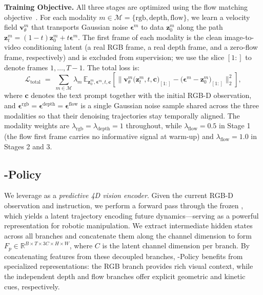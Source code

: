 \noindent
\textbf{Training Objective.}
All three stages are optimized using the flow matching objective~\citep{lipman2022flow}. For each modality $m \in \mathcal{M} = \{\text{rgb}, \text{depth}, \text{flow}\}$, we learn a velocity field $\bm{v}_\theta^m$ that transports Gaussian noise $\bm{\epsilon}^m$ to data $\bm{z}_0^m$ along the path $\bm{z}_t^m = (1-t)\bm{z}_0^m + t\bm{\epsilon}^m$. The first frame of each modality is the clean image-to-video conditioning latent (a real RGB frame, a real depth frame, and a zero-flow frame, respectively) and is excluded from supervision; we use the slice $[1{:}]$ to denote frames $1,\dots,T-1$. The total loss is:
\begin{equation}
\label{eq:flow_matching_main}
\mathcal{L}_{\text{total}} \;=\; \sum_{m \in \mathcal{M}} \lambda_m \,
        \mathbb{E}_{\bm{z}_0^m, \bm{\epsilon}^m, t, \bm{c}}
        \!\left[\bigl\| \bm{v}_\theta^m\!\bigl(\bm{z}_t^m, t, \bm{c}\bigr)_{[1{:}]}
        - \bigl(\bm{\epsilon}^m - \bm{z}_0^m\bigr)_{[1{:}]} \bigr\|_2^2\right],
\end{equation}                 
where $\bm{c}$ denotes the text prompt together with the initial RGB-D observation, and $\bm{\epsilon}^{\text{rgb}} = \bm{\epsilon}^{\text{depth}} = \bm{\epsilon}^{\text{flow}}$ is a single Gaussian noise sample shared across the three modalities so 
that their denoising trajectories stay temporally aligned. The modality weights are $\lambda_{\text{rgb}} = \lambda_{\text{depth}} = 1$ throughout, while $\lambda_{\text{flow}} = 0.5$ in Stage 1 (the flow first frame carries no informative signal at warm-up) and $\lambda_{\text{flow}} = 1.0$ in Stages 2 and 3.



\subsection{\our-Policy}
\label{sec:action}
We leverage \our as a \textit{predictive 4D vision encoder}. 
Given the current RGB-D observation and instruction, we perform a forward pass through the frozen \our, which yields a latent trajectory encoding future dynamics—serving as a powerful representation for robotic manipulation.
We extract intermediate hidden states across all branches and concatenate them along the channel dimension to form $F_p \in \mathbb{R}^{B \times T \times 3C \times H \times W}$, where $C$ is the latent channel dimension per branch. By concatenating features from these decoupled branches, \our-Policy benefits from specialized representations: the RGB branch provides rich visual context, while the independent depth and flow branches offer explicit geometric and kinetic cues, respectively.

